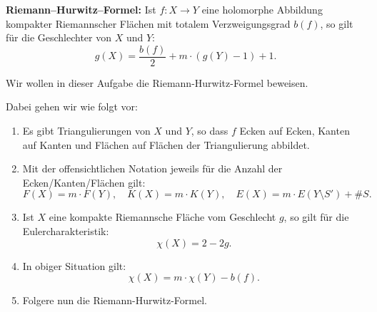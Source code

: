 \documentclass[a4paper,11pt]{article}
\newcounter{aufg}
\newcommand{\Aufg}{\stepcounter{aufg}\vspace*{0.2cm}\noindent{\bf
    Aufgabe \arabic{aufg}:} }
\begin{document}
\vspace{1em}

\noindent\textbf{Riemann--Hurwitz--Formel:}
Ist \( f : X \to Y \) eine holomorphe Abbildung kompakter Riemannscher Flächen 
mit totalem Verzweigungsgrad \( b(f) \), so gilt für die Geschlechter von \( X \) und \( Y \):
\[
g(X) = \frac{b(f)}{2} + m \cdot ( g(Y) - 1 ) + 1.
\]

\vspace{1em}

\Aufg Wir wollen in dieser Aufgabe die Riemann-Hurwitz-Formel beweisen.

\vspace{0.5em}

Dabei gehen wir wie folgt vor:

\begin{enumerate}[label=\roman*)]
	\item Es gibt Triangulierungen von \( X \) und \( Y \), so dass \( f \) Ecken auf Ecken, 
	Kanten auf Kanten und Flächen auf Flächen der Triangulierung abbildet.
	
	\item Mit der offensichtlichen Notation jeweils für die Anzahl der Ecken/Kanten/Flächen gilt:
	\[
	F(X) = m \cdot F(Y), \quad K(X) = m \cdot K(Y), \quad 
	E(X) = m \cdot E(Y \setminus S') + \#S.
	\]
	
	\item Ist \( X \) eine kompakte Riemannsche Fläche vom Geschlecht \( g \), so gilt für die Eulercharakteristik:
	\[
	\chi(X) = 2 - 2g.
	\]
	
	\item In obiger Situation gilt:
	\[
	\chi(X) = m \cdot \chi(Y) - b(f).
	\]
	\item Folgere nun die Riemann-Hurwitz-Formel.
\end{enumerate}
\end{document}

